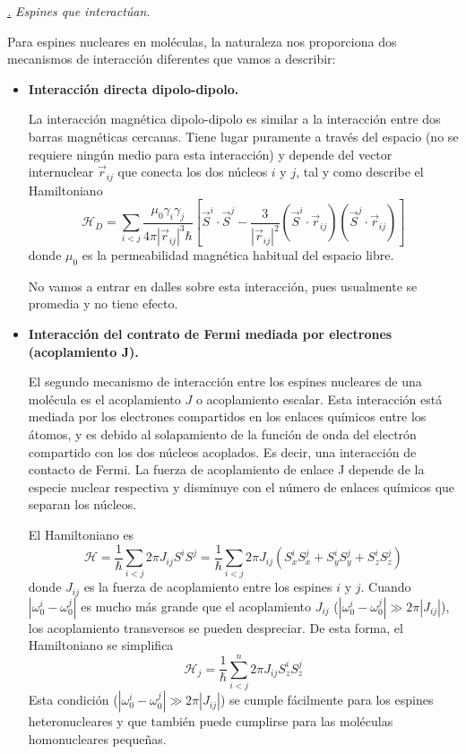 \documentclass[a4paper,11pt]{book} %
\numberwithin{equation}{chapter}
\def\lp{\left(}
\def\rp{\right)}
\def\lc{\left[}
\def\rc{\right]}
\def\subsubiContadorIt{\par\addtocounter{subsubsection}{1}\underline{\it\thesubsubsection.}\hskip0.5cm \setcounter{subsubsubsectionIt}{0}}
\newcommand{\SubsubiIt}[1]{
		\subsubiContadorIt \textit{#1}
	}
\newcounter{subsubsubsectionIt}[subsubsection]
\begin{document}
			\SubsubiIt{Espines que interactúan.} 

Para espines nucleares en moléculas, la naturaleza nos proporciona dos mecanismos de interacción diferentes que vamos a describir: 
\begin{itemize}
	\item \textbf{Interacción directa dipolo-dipolo.}
	
La interacción magnética dipolo-dipolo es similar a la interacción entre dos barras magnéticas cercanas. Tiene lugar puramente a través del espacio (no se requiere ningún medio para esta interacción) y depende del vector internuclear $\vec{r}_{ij}$ que conecta los dos núcleos $i$ y $j$, tal y como describe el Hamiltoniano
	\begin{equation} \label{ec_Hardware_NMR_H_dipolo-dipolo}
	\mathcal{H}_D = \sum_{i<j} \frac{\mu_0 \gamma_i \gamma_j}{4 \pi | \vec{r}_{ij}|^3 \hbar} 
	\lc \vec{S}^i \cdot \vec{S}^j - \frac{3}{| \vec{r}_{ij}|^2} \lp \vec{S}^i \cdot \vec{r}_{ij} \rp \lp \vec{S}^j \cdot \vec{r}_{ij} \rp \rc
	\end{equation}
donde $\mu_0$ es la permeabilidad magnética habitual del espacio libre. 

No vamos a entrar en dalles sobre esta interacción, pues usualmente se promedia y no tiene efecto.
	
	\item \textbf{Interacción del contrato de Fermi mediada por electrones (acoplamiento J).}

	El segundo mecanismo de interacción entre los espines nucleares de una molécula es el acoplamiento $J$ o acoplamiento escalar. Esta interacción está mediada por los electrones compartidos en los enlaces químicos entre los átomos, y es debido al solapamiento de la función de onda del electrón compartido con los dos núcleos acoplados. Es decir, una interacción de contacto de Fermi. La fuerza de acoplamiento de enlace J depende de la especie nuclear respectiva y disminuye con el número de enlaces químicos que separan los núcleos.

El Hamiltoniano es
	\begin{equation}
	\mathcal{H} = \frac{1}{\hbar} \sum_{i <j} 2 \pi J_{ij} S^i S^j = 
	\frac{1}{\hbar} \sum_{i < j} 2 \pi J_{ij} \lp S_x^i S_x^j + S_y^i S_y^j + S_z^i S_z^j  \rp
	\end{equation}
donde $J_{ij}$ es la fuerza de acoplamiento entre los espines $i$ y $j$. Cuando $| \omega_0^i - \omega_0^j |$ es mucho más grande que el acoplamiento $J_{ij}$ ($| \omega_0^i - \omega_0^j | \gg 2 \pi |J_{ij}|$), los acoplamiento transversos se pueden despreciar. De esta forma, el Hamiltoniano se simplifica
	\begin{equation} \label{ec_Hardware_NMR_J_coupling}
	\boxed{\mathcal{H}_j = \frac{1}{\hbar} \sum_{i < j}^n 2 \pi J_{ij} S_z^{i} S_z^{j}}
	\end{equation}
Esta condición ($| \omega_0^i - \omega_0^j | \gg 2 \pi |J_{ij}|$) se cumple fácilmente para los espines heteronucleares y que también puede cumplirse para las moléculas homonucleares pequeñas.


\end{itemize}
\end{document}
